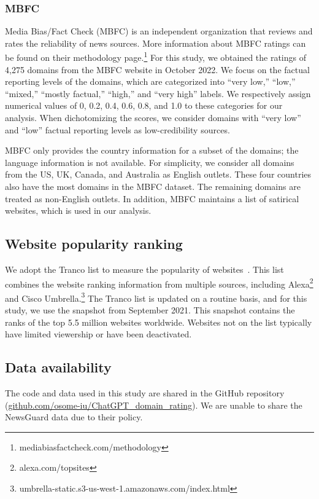 \documentclass{article}
\begin{document}
\subsubsection{MBFC}

Media Bias/Fact Check (MBFC) is an independent organization that reviews and rates the reliability of news sources.
More information about MBFC ratings can be found on their methodology page.\footnote{mediabiasfactcheck.com/methodology}
For this study, we obtained the ratings of 4,275 domains from the MBFC website in October 2022.
We focus on the factual reporting levels of the domains, which are categorized into ``very low,'' ``low,'' ``mixed,'' ``mostly factual,'' ``high,'' and ``very high'' labels.
We respectively assign numerical values of 0, 0.2, 0.4, 0.6, 0.8, and 1.0 to these categories for our analysis.
When dichotomizing the scores, we consider domains with ``very low'' and ``low'' factual reporting levels as low-credibility sources.

MBFC only provides the country information for a subset of the domains; the language information is not available.
For simplicity, we consider all domains from the US, UK, Canada, and Australia as English outlets.
These four countries also have the most domains in the MBFC dataset.
The remaining domains are treated as non-English outlets.
In addition, MBFC maintains a list of satirical websites, which is used in our analysis.

\subsection{Website popularity ranking}

We adopt the Tranco list to measure the popularity of websites~\cite{pochat2018tranco}.
This list combines the website ranking information from multiple sources, including Alexa\footnote{alexa.com/topsites} and Cisco Umbrella.\footnote{umbrella-static.s3-us-west-1.amazonaws.com/index.html}
The Tranco list is updated on a routine basis, and for this study, we use the snapshot from September 2021.
This snapshot contains the ranks of the top 5.5 million websites worldwide.
Websites not on the list typically have limited viewership or have been deactivated.

\subsection{Data availability}

The code and data used in this study are shared in the GitHub repository (\url{github.com/osome-iu/ChatGPT_domain_rating}).
We are unable to share the NewsGuard data due to their policy.



\end{document}
